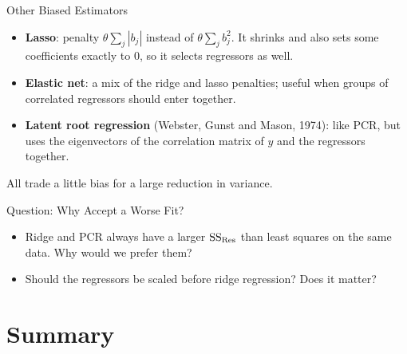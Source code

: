 \begin{frame}{Other Biased Estimators}
    \begin{itemize}
        \item \textbf{Lasso}: penalty $\theta\sum_j|b_j|$ instead of $\theta\sum_jb_j^2$. It shrinks and also sets some coefficients exactly to 0, so it selects regressors as well.
        \item \textbf{Elastic net}: a mix of the ridge and lasso penalties; useful when groups of correlated regressors should enter together.
        \item \textbf{Latent root regression} (Webster, Gunst and Mason, 1974): like PCR, but uses the eigenvectors of the correlation matrix of $y$ and the regressors together.
    \end{itemize}
    \svspace{0.5em}
    All trade a little bias for a large reduction in variance.
\end{frame}


\begin{frame}{Question: Why Accept a Worse Fit?}
    \begin{itemize}
        \item Ridge and PCR always have a larger $\mathrm{SS}_{\mathrm{Res}}$ than least squares on the same data. Why would we prefer them?
        \item Should the regressors be scaled before ridge regression? Does it matter?
    \end{itemize}
\end{frame}


\section{Summary}


